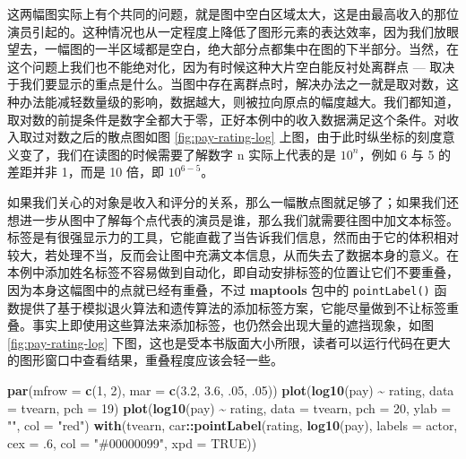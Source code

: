 \documentclass[
  b5paper,
  UTF8,twoside]{book}
\newenvironment{Shaded}{\begin{snugshade}}{\end{snugshade}}
\newcommand{\AttributeTok}[1]{\textcolor[rgb]{0.13,0.29,0.53}{#1}}
\newcommand{\ConstantTok}[1]{\textcolor[rgb]{0.56,0.35,0.01}{#1}}
\newcommand{\DecValTok}[1]{\textcolor[rgb]{0.00,0.00,0.81}{#1}}
\newcommand{\FloatTok}[1]{\textcolor[rgb]{0.00,0.00,0.81}{#1}}
\newcommand{\FunctionTok}[1]{\textcolor[rgb]{0.13,0.29,0.53}{\textbf{#1}}}
\newcommand{\NormalTok}[1]{#1}
\newcommand{\SpecialCharTok}[1]{\textcolor[rgb]{0.81,0.36,0.00}{\textbf{#1}}}
\newcommand{\StringTok}[1]{\textcolor[rgb]{0.31,0.60,0.02}{#1}}
\begin{document}
这两幅图实际上有个共同的问题，就是图中空白区域太大，这是由最高收入的那位演员引起的。这种情况也从一定程度上降低了图形元素的表达效率，因为我们放眼望去，一幅图的一半区域都是空白，绝大部分点都集中在图的下半部分。当然，在这个问题上我们也不能绝对化，因为有时候这种大片空白能反衬处离群点 --- 取决于我们要显示的重点是什么。当图中存在离群点时，解决办法之一就是取对数，这种办法能减轻数量级的影响，数据越大，则被拉向原点的幅度越大。我们都知道，取对数的前提条件是数字全都大于零，正好本例中的收入数据满足这个条件。对收入取过对数之后的散点图如图 \ref{fig:pay-rating-log} 上图，由于此时纵坐标的刻度意义变了，我们在读图的时候需要了解数字 n 实际上代表的是 \(10^{n}\)，例如 6 与 5 的差距并非 1，而是 10 倍，即 \(10^{6-5}\)。

如果我们关心的对象是收入和评分的关系，那么一幅散点图就足够了；如果我们还想进一步从图中了解每个点代表的演员是谁，那么我们就需要往图中加文本标签。标签是有很强显示力的工具，它能直截了当告诉我们信息，然而由于它的体积相对较大，若处理不当，反而会让图中充满文本信息，从而失去了数据本身的意义。在本例中添加姓名标签不容易做到自动化，即自动安排标签的位置让它们不要重叠，因为本身这幅图中的点就已经有重叠，不过 \textbf{maptools} 包中的 \texttt{pointLabel()} 函数提供了基于模拟退火算法和遗传算法的添加标签方案，它能尽量做到不让标签重叠。事实上即使用这些算法来添加标签，也仍然会出现大量的遮挡现象，如图 \ref{fig:pay-rating-log} 下图，这也是受本书版面大小所限，读者可以运行代码在更大的图形窗口中查看结果，重叠程度应该会轻一些。

\begin{Shaded}
\begin{Highlighting}[]
\FunctionTok{par}\NormalTok{(}\AttributeTok{mfrow =} \FunctionTok{c}\NormalTok{(}\DecValTok{1}\NormalTok{, }\DecValTok{2}\NormalTok{), }\AttributeTok{mar =} \FunctionTok{c}\NormalTok{(}\FloatTok{3.2}\NormalTok{, }\FloatTok{3.6}\NormalTok{, .}\DecValTok{05}\NormalTok{, .}\DecValTok{05}\NormalTok{))}
\FunctionTok{plot}\NormalTok{(}\FunctionTok{log10}\NormalTok{(pay) }\SpecialCharTok{\textasciitilde{}}\NormalTok{ rating, }\AttributeTok{data =}\NormalTok{ tvearn, }\AttributeTok{pch =} \DecValTok{19}\NormalTok{)}
\FunctionTok{plot}\NormalTok{(}\FunctionTok{log10}\NormalTok{(pay) }\SpecialCharTok{\textasciitilde{}}\NormalTok{ rating, }\AttributeTok{data =}\NormalTok{ tvearn, }\AttributeTok{pch =} \DecValTok{20}\NormalTok{, }\AttributeTok{ylab =} \StringTok{""}\NormalTok{, }\AttributeTok{col =} \StringTok{"red"}\NormalTok{)}
\FunctionTok{with}\NormalTok{(tvearn, car}\SpecialCharTok{::}\FunctionTok{pointLabel}\NormalTok{(rating, }\FunctionTok{log10}\NormalTok{(pay), }\AttributeTok{labels =}\NormalTok{ actor, }
                        \AttributeTok{cex =}\NormalTok{ .}\DecValTok{6}\NormalTok{, }\AttributeTok{col =} \StringTok{"\#00000099"}\NormalTok{, }\AttributeTok{xpd =} \ConstantTok{TRUE}\NormalTok{))}
\end{Highlighting}
\end{Shaded}
\end{document}
